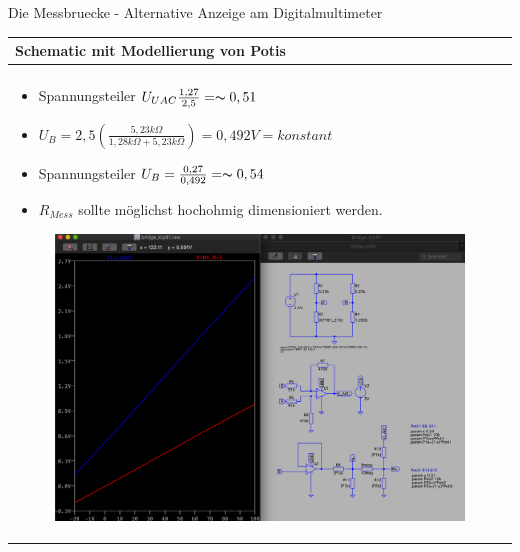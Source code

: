 \begin{frame}[t]{Die Messbruecke - Alternative Anzeige am Digitalmultimeter}

    \begin{spacing}{0.9} \begin{tiny}
            \begin{table}[h!]
                \begin{tabular}{p{10cm} }
                    \hline
                    \textbf{Schematic mit Modellierung von Potis} \\
                    \hline                                        \\
                    \begin{minipage}{\textwidth}
                        \begin{itemize}
                            \item Spannungsteiler $U_{UAC} \frac{1,27}{2,5}=\thicksim 0,51$
                            \item $U_{B}=2,5(\frac{5,23k\Omega}{1,28k\Omega+5,23k\Omega})=0,492V=konstant$
                            \item Spannungsteiler $U_{B}=\frac{0,27}{0,492}=\thicksim 0,54$
                            \item $R_{Mess}$ sollte möglichst hochohmig dimensioniert werden.
                        \end{itemize}
                        \begin{figure}
                            \centering
                            \includegraphics[width=0.7\linewidth]{pictures/digi_mul_anpassung.png}
                        \end{figure}
                    \end{minipage}
                \end{tabular}

            \end{table}

        \end{tiny} \end{spacing}

\end{frame}

